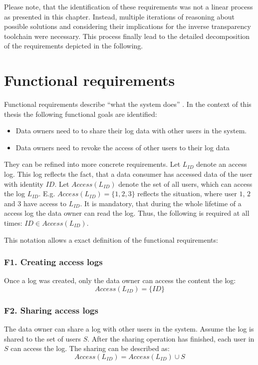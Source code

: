 \documentclass[../main.tex]{subfiles}
\begin{document}
Please note, that the identification of these requirements was not a linear process as presented in this chapter.
Instead, multiple iterations of reasoning about possible solutions and considering their implications for the inverse transparency toolchain were necessary.
This process finally lead to the detailed decomposition of the requirements depicted in the following.


\newpage
\section{Functional requirements}\label{functional-requriements}
Functional requirements describe \enquote{what the system does} \cite[11]{Mylopoulos1992}.
In the context of this thesis the following functional goals are identified:
\begin{itemize}
    \item Data owners need to to share their log data with other users in the system.
    \item Data owners need to revoke the access of other users to their log data
\end{itemize}

They can be refined into more concrete requirements. 
Let $L_{ID}$ denote an access log. 
This log reflects the fact, that a data consumer has accessed data of the user with identity $ID$.
Let $Access(L_{ID})$ denote the set of all users, which can access the log $L_{ID}$.
E.g. $Access(L_{ID}) =\{1,2,3\}$ reflects the situation, where user $1$, $2$ and $3$ have access to $L_{ID}$.
It is mandatory, that during the whole lifetime of a access log the data owner can read the log.
Thus, the following is required at all times: $ ID \in Access(L_{ID})$.

This notation allows a exact definition of the functional requirements:

\subsubsection{F1. Creating access logs}
Once a log was created, only the data owner can access the content the log:
\begin{displaymath}
    Access(L_{ID}) =\{ID\}
\end{displaymath}

\subsubsection{F2. Sharing access logs}
The data owner can share a log with other users in the system. 
Assume the log is shared to the set of users $S$.
After the sharing operation has finished, each user in $S$ can access the log.
The sharing can be described as: 
\begin{displaymath}
    Access(L_{ID}) = Access(L_{ID}) \cup S
\end{displaymath}
\end{document}
